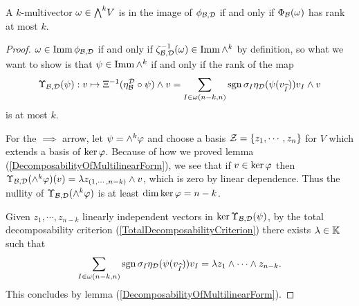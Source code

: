 \begin{proposition}\label{RankCriterionForImageOfPlucker}
A $k$-multivector $\omega\in \bw V$ is in the image of $\phi_{\mathcal{B},\mathcal{D}}$ if and only if $\Phi_{\mathcal{B}}(\omega)$ has rank at most $k$.
\end{proposition}
\begin{proof}
$\omega\in \mathrm{Imm}\, \phi_{\mathcal{B},\mathcal{D}}$ if and only if $\zeta_{\mathcal{B},\mathcal{D}}^{-1}(\omega)\in \mathrm{Imm}\, \wedge^k$ by definition, so what we want to show is that $\psi\in \mathrm{Imm}\, \wedge^k$ if and only if the rank of the map 
\[\Upsilon_{\mathcal{B},\mathcal{D}}(\psi):v\mapsto \Xi^{-1}(\eta^{\mathcal{D}}_{\mathcal{B}}\circ \psi)\wedge v=\sum_{I\in\omega(n-k,n)}\mathrm{sgn}\,\sigma_I\eta_{\mathcal{D}}(\psi(v_{\widehat{I}}))v_I\wedge v\] 
is at most $k$.

For the $\implies$ arrow, let $\psi=\wedge^k\varphi$ and choose a basis $\mathcal{Z}=\left\{{z_1,\cdots, z_n}\right\}$ for $V$ which extends a basis of $\ker\varphi$. Because of how we proved lemma (\ref{DecomposabilityOfMultilinearForm}), we see that if $v\in\ker\varphi$ then $\Upsilon_{\mathcal{B},\mathcal{D}}(\wedge^k\varphi)(v)=\lambda z_{(1,\cdots, n-k)}\wedge v$, which is zero by linear dependence. Thus the nullity of $\Upsilon_{\mathcal{B},\mathcal{D}}(\wedge^k\varphi)$ is at least $\dim\ker\varphi=n-k$.\medskip

Given $z_1,\cdots, z_{n-k}$ linearly independent vectors in $\ker\Upsilon_{\mathcal{B},\mathcal{D}}(\psi)$, by the total decomposability criterion (\ref{TotalDecomposabilityCriterion}) there exists $\lambda\in\mathbb{K}$ such that
\[\sum_{I\in \omega(n-k,n)}\mathrm{sgn}\,\sigma_I\eta_{\mathcal{D}}(\psi(v_{\widehat{I}}))v_I=\lambda z_1\wedge\cdots \wedge z_{n-k}.\]
This concludes by lemma (\ref{DecomposabilityOfMultilinearForm}).
\end{proof}


